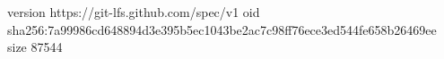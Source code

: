 version https://git-lfs.github.com/spec/v1
oid sha256:7a99986cd648894d3e395b5ec1043be2ac7c98ff76ece3ed544fe658b26469ee
size 87544
